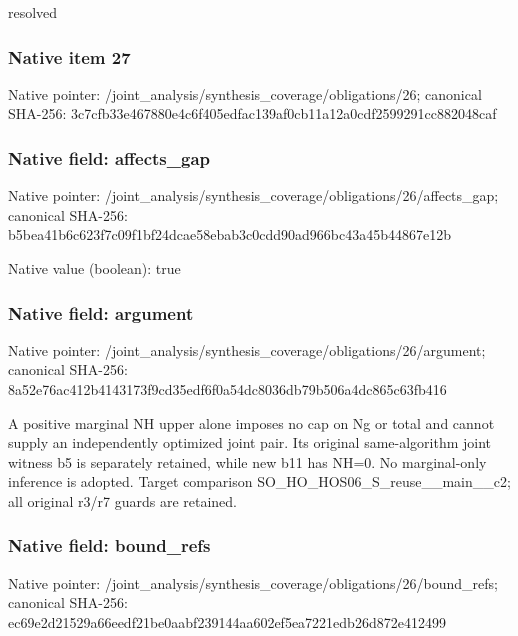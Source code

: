 \documentclass[10pt,a4paper]{article}
\begin{document}
\begingroup\raggedright\sloppy resolved\par\endgroup

\subsubsection{Native item 27}
Native pointer: /joint\_\allowbreak{}analysis/synthesis\_\allowbreak{}coverage/obligations/26; canonical SHA-256: 3c7cfb33e467880e4c6f405edfac139af0cb11a12a0cdf2599291cc882048caf

\subsubsection{Native field: affects\_\allowbreak{}gap}
Native pointer: /joint\_\allowbreak{}analysis/synthesis\_\allowbreak{}coverage/obligations/26/affects\_\allowbreak{}gap; canonical SHA-256: b5bea41b6c623f7c09f1bf24dcae58ebab3c0cdd90ad966bc43a45b44867e12b

Native value (boolean): true

\subsubsection{Native field: argument}
Native pointer: /joint\_\allowbreak{}analysis/synthesis\_\allowbreak{}coverage/obligations/26/argument; canonical SHA-256: 8a52e76ac412b4143173f9cd35edf6f0a54dc8036db79b506a4dc865c63fb416

\begingroup\raggedright\sloppy A positive marginal NH upper alone imposes no cap on Ng or total and cannot supply an independently optimized joint pair. Its original same-algorithm joint witness b5 is separately retained,\allowbreak{} while new b11 has NH=\allowbreak{}0. No marginal-only inference is adopted. Target comparison SO\_\allowbreak{}HO\_\allowbreak{}HOS06\_\allowbreak{}S\_\allowbreak{}reuse\_\allowbreak{}\_\allowbreak{}main\_\allowbreak{}\_\allowbreak{}c2;\allowbreak{} all original r3/\allowbreak{}r7 guards are retained.\par\endgroup

\subsubsection{Native field: bound\_\allowbreak{}refs}
Native pointer: /joint\_\allowbreak{}analysis/synthesis\_\allowbreak{}coverage/obligations/26/bound\_\allowbreak{}refs; canonical SHA-256: ec69e2d21529a66eedf21be0aabf239144aa602ef5ea7221edb26d872e412499
\end{document}
